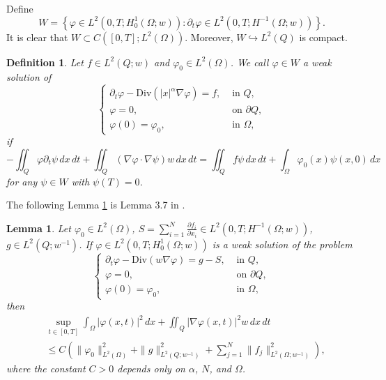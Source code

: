 \documentclass[11pt]{article}
\newtheorem{lemma}{Lemma}[section]
\newtheorem{definition}{Definition}[section]
\numberwithin{equation}{section}
\begin{document}
Define
\begin{equation*}
W = \left\{\varphi \in L^2(0, T; H_0^1(\Omega; w)) \colon \partial_t \varphi \in L^2(0, T; H^{-1}(\Omega; w))\right\}.
\end{equation*}
It is clear that $W \subset C([0, T]; L^2(\Omega))$. Moreover, $W \hookrightarrow L^2(Q)$ is compact.
\begin{definition}\label{08.16.D1}
Let $f \in L^2(Q; w)$ and $\varphi_0 \in L^2(\Omega)$. We call $\varphi \in W$ a \emph{weak solution} of
\begin{equation}\label{03.01.1}
\begin{cases}
\partial_t \varphi - \mathrm{Div}(|x|^\alpha \nabla \varphi) = f, &\text{ in } Q, \\
\varphi = 0, &\text{ on } \partial Q, \\
\varphi(0) = \varphi_0, &\text{ in } \Omega,
\end{cases}
\end{equation}
if
\begin{equation*}
-\iint_Q \varphi \partial_t \psi \, dx \, dt + \iint_Q (\nabla \varphi \cdot \nabla \psi)w \, dx \, dt = \iint_Q f \psi \, dx \, dt + \int_\Omega \varphi_0(x)\psi(x, 0) \, dx
\end{equation*}
for any $\psi \in W$ with $\psi(T) = 0$.
\end{definition}
The following Lemma \ref{12.09.L1} is Lemma 3.7 in \cite{FF}.
\begin{lemma}\label{12.09.L1}
Let $\varphi_0 \in L^2(\Omega)$, $S = \sum_{i=1}^N \frac{\partial f_i}{\partial x_i} \in L^2(0, T; H^{-1}(\Omega; w))$, $g \in L^2(Q; w^{-1})$. If $\varphi \in L^2(0, T; H_0^1(\Omega; w))$ is a weak solution of the problem
\begin{equation*}
\begin{cases}
\partial_t \varphi - \mathrm{Div}(w \nabla \varphi) = g - S, &\text{ in } Q, \\
\varphi = 0, &\text{ on } \partial Q, \\
\varphi(0) = \varphi_0, &\text{ in } \Omega,
\end{cases}
\end{equation*}
then
\begin{equation}\label{12.09.1}
\begin{split}
&\sup_{t \in [0, T]} \int_\Omega |\varphi(x, t)|^2 \, dx + \iint_Q |\nabla \varphi(x, t)|^2 w \, dx \, dt \\
&\leq C\left(\|\varphi_0\|_{L^2(\Omega)}^2 + \|g\|_{L^2(Q; w^{-1})}^2 + \sum_{j=1}^N \|f_j\|_{L^2(\Omega; w^{-1})}^2\right),
\end{split}
\end{equation}
where the constant $C > 0$ depends only on $\alpha$, $N$, and $\Omega$.
\end{lemma}
\end{document}
